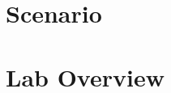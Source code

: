 



\usepackage{enumitem}
\usepackage{graphicx}
\usepackage{addfont}
\usepackage{subfig}
\usepackage{multicol}




\renewcommand{\labnumber}{\pollinglabnumber}
\renewcommand{\labname}{Using Polling with Memory-Mapped Input/Output}
\renewcommand{\shortlabname}{memory-mapped i/o -- pollinglab}
\renewcommand{\collaborationrules}{\pollinglabcollaboration}
\renewcommand{\duedate}{\pollinglabdue}
\newcommand{\nano}{\developmentboard} %
\renewcommand{\runtimeenvironment}{\pollinglabenvironment}
\pagelayout

    \labidentifier


    \softwareengineeringfrontmatter

    \section*{Scenario}                                                             \IntroduceHardware

    \section{Lab Overview}                                                          

